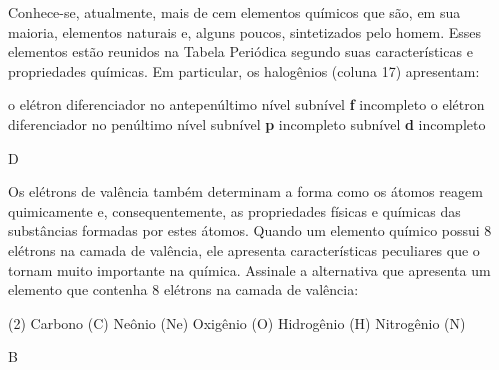 \documentclass[9 pt]{scrartcl}
\def\PQ{0.84} %
\begin{document}
\begin{exercise}[points=\PQ]
Conhece-se, atualmente, mais de cem elementos químicos que são, em sua maioria, elementos
naturais e, alguns poucos, sintetizados pelo homem. Esses elementos estão reunidos na Tabela Periódica segundo suas características e propriedades químicas.
Em particular, os halogênios (coluna 17) apresentam:
\begin{choice}
\choice o elétron diferenciador no antepenúltimo nível
\choice subnível \textbf{f} incompleto
\choice o elétron diferenciador no penúltimo nível
\choice subnível \textbf{p} incompleto
\choice subnível \textbf{d} incompleto
\end{choice}
\end{exercise}
\begin{solution}
D
\end{solution}



\begin{exercise}[points=\PQ]
Os elétrons de valência também determinam a forma como os átomos reagem quimicamente e, consequentemente, as propriedades físicas e químicas das substâncias formadas por estes átomos. Quando um elemento químico possui 8 elétrons na camada de valência, ele apresenta características peculiares que o tornam muito importante na química. Assinale a alternativa que apresenta um elemento que contenha 8 elétrons na camada de valência:

\begin{choice}(2)
\choice Carbono (C)
\choice Neônio (Ne)
\choice Oxigênio (O)
\choice Hidrogênio (H)
\choice Nitrogênio (N)
\end{choice}
\end{exercise}
\begin{solution}
B
\end{solution}
\end{document}
